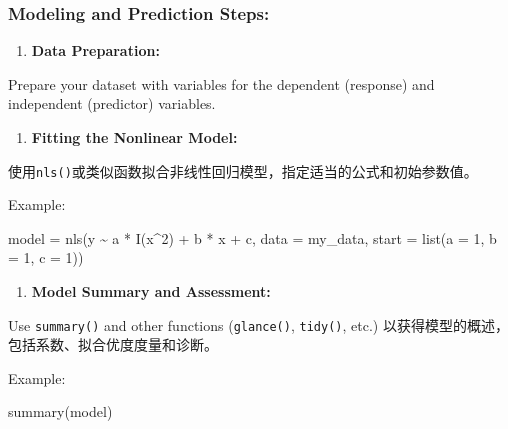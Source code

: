 \documentclass[
]{article}
\newenvironment{Shaded}{}{}
\newcommand{\AttributeTok}[1]{\textcolor[rgb]{0.49,0.56,0.16}{#1}}
\newcommand{\DecValTok}[1]{\textcolor[rgb]{0.25,0.63,0.44}{#1}}
\newcommand{\FunctionTok}[1]{\textcolor[rgb]{0.02,0.16,0.49}{#1}}
\newcommand{\NormalTok}[1]{#1}
\newcommand{\OtherTok}[1]{\textcolor[rgb]{0.00,0.44,0.13}{#1}}
\newcommand{\SpecialCharTok}[1]{\textcolor[rgb]{0.25,0.44,0.63}{#1}}
\begin{document}
\hypertarget{modeling-and-prediction-steps}{%
\subsubsection{Modeling and Prediction
Steps:}\label{modeling-and-prediction-steps}}

\begin{enumerate}
\def\labelenumi{\arabic{enumi}.}
\item
  \textbf{Data Preparation:}
\end{enumerate}

Prepare your dataset with variables for the dependent (response) and
independent (predictor) variables.

\begin{enumerate}
\def\labelenumi{\arabic{enumi}.}
\item
  \textbf{Fitting the Nonlinear Model:}
\end{enumerate}

使用\texttt{nls()}或类似函数拟合非线性回归模型，指定适当的公式和初始参数值。

Example:

\begin{Shaded}
\begin{Highlighting}[]
\NormalTok{model }\OtherTok{=} 
\FunctionTok{nls}\NormalTok{(y }\SpecialCharTok{\textasciitilde{}}\NormalTok{ a }\SpecialCharTok{*} \FunctionTok{I}\NormalTok{(x}\SpecialCharTok{\^{}}\DecValTok{2}\NormalTok{) }\SpecialCharTok{+}\NormalTok{ b }\SpecialCharTok{*}\NormalTok{ x }\SpecialCharTok{+}\NormalTok{ c, }
    \AttributeTok{data =}\NormalTok{ my\_data,}
    \AttributeTok{start =} \FunctionTok{list}\NormalTok{(}\AttributeTok{a =} \DecValTok{1}\NormalTok{, }\AttributeTok{b =} \DecValTok{1}\NormalTok{, }\AttributeTok{c =} \DecValTok{1}\NormalTok{))}
\end{Highlighting}
\end{Shaded}

\begin{enumerate}
\def\labelenumi{\arabic{enumi}.}
\item
  \textbf{Model Summary and Assessment:}
\end{enumerate}

Use \texttt{summary()} and other functions (\texttt{glance()},
\texttt{tidy()}, etc.) 以获得模型的概述，包括系数、拟合优度度量和诊断。

Example:

\begin{Shaded}
\begin{Highlighting}[]
\FunctionTok{summary}\NormalTok{(model)}
\end{Highlighting}
\end{Shaded}
\end{document}
